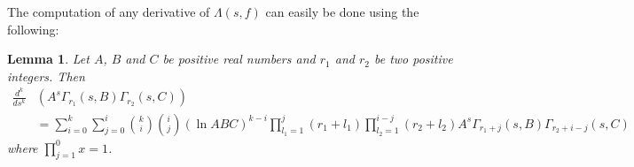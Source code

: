 \documentclass{article}
\theoremstyle{plain}
\newtheorem{lemma}{Lemma}
\begin{document}
The computation of any derivative of $\Lambda(s,f)$ can easily be done using the following:
\begin{lemma}\label{computation}
Let $A$, $B$ and $C$ be positive real numbers and $r_1$ and $r_2$ be two positive integers. Then
\begin{equation*}
\begin{split}
\frac{d^k}{ds^k} & \left( A^{s} \Gamma_{r_1}(s,B) \Gamma_{r_2}(s, C)\right)\\
&= \sum_{i=0}^{k}\sum_{j=0}^{i}\binom{k}{i}\binom{i}{j} (\ln ABC)^{k-i} \prod_{l_1=1}^{j} (r_1+l_1) \prod_{l_2=1}^{i-j}(r_2+l_2)
A^{s} \Gamma_{r_1+j}(s,B) \Gamma_{r_2+i-j}(s, C)
\end{split}
\end{equation*}
where $\prod_{j=1}^{0} x =1$.
\end{lemma}
\end{document}
